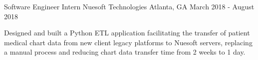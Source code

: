 \begin{cventries}
  \cventry
    {Software Engineer Intern} %
    {Nuesoft Technologies} %
    {Atlanta, GA} %
    {March 2018 - August 2018} %
    {
      \begin{cvitems} %
        \item {Designed and built a Python ETL application facilitating the
        transfer of patient medical chart data from new client legacy platforms to Nuesoft servers, replacing a manual process and reducing chart data transfer time from 2 weeks to 1 day.}
      \end{cvitems}
    }

\end{cventries}
